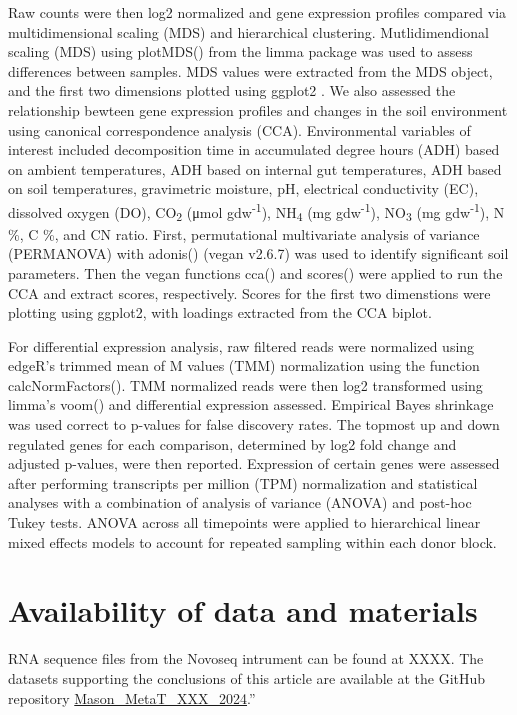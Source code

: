 \documentclass[
  sn-nature,
  lineno, referee]{sn-jnl}
\begin{document}
Raw counts were then log2 normalized and gene expression profiles
compared via multidimensional scaling (MDS) and hierarchical clustering.
Mutlidimendional scaling (MDS) using plotMDS() from the limma package
was used to assess differences between samples. MDS values were
extracted from the MDS object, and the first two dimensions plotted
using ggplot2 \citep{wickham_ggplot2_2016}. We also assessed the
relationship bewteen gene expression profiles and changes in the soil
environment using canonical correspondence analysis (CCA). Environmental
variables of interest included decomposition time in accumulated degree
hours (ADH) based on ambient temperatures, ADH based on internal gut
temperatures, ADH based on soil temperatures, gravimetric moisture, pH,
electrical conductivity (EC), dissolved oxygen (DO), CO\textsubscript{2}
(μmol gdw\textsuperscript{-1}), NH\textsubscript{4} (mg
gdw\textsuperscript{-1}), NO\textsubscript{3} (mg
gdw\textsuperscript{-1}), N \%, C \%, and CN ratio. First, permutational
multivariate analysis of variance (PERMANOVA) with adonis() (vegan
v2.6.7) \citep{oksanen_vegan_2024} was used to identify significant soil
parameters. Then the vegan functions cca() and scores() were applied to
run the CCA and extract scores, respectively. Scores for the first two
dimenstions were plotting using ggplot2, with loadings extracted from
the CCA biplot.

For differential expression analysis, raw filtered reads were normalized
using edgeR's trimmed mean of M values (TMM) normalization using the
function calcNormFactors(). TMM normalized reads were then log2
transformed using limma's voom() and differential expression assessed.
Empirical Bayes shrinkage was used correct to p-values for false
discovery rates. The topmost up and down regulated genes for each
comparison, determined by log2 fold change and adjusted p-values, were
then reported. Expression of certain genes were assessed after
performing transcripts per million (TPM) normalization and statistical
analyses with a combination of analysis of variance (ANOVA) and post-hoc
Tukey tests. ANOVA across all timepoints were applied to hierarchical
linear mixed effects models to account for repeated sampling within each
donor block.

\section{Availability of data and
materials}\label{availability-of-data-and-materials}

RNA sequence files from the Novoseq intrument can be found at XXXX. The
datasets supporting the conclusions of this article are available at the
GitHub repository
\href{https://github.com/amason30/Mason_MetaT_XXX_2024}{Mason\_MetaT\_XXX\_2024}.''
\end{document}
